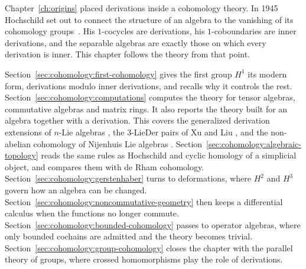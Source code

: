 Chapter~\ref{ch:origins} placed derivations inside a cohomology theory. In 1945 Hochschild
set out to connect the structure of an algebra to the vanishing of its cohomology
groups~\cite[p.~58]{Hochschild1945}. His $1$-cocycles are derivations, his
$1$-coboundaries are inner derivations, and the separable algebras are exactly those
on which every derivation is inner. This chapter follows the theory from that point.

Section~\ref{sec:cohomology:first-cohomology} gives the first group $H^1$ its modern
form, derivations modulo inner derivations, and recalls why it controls the rest.
Section~\ref{sec:cohomology:computations} computes the theory for tensor algebras,
commutative algebras and matrix rings. It also reports the theory built for an
algebra together with a derivation. This covers the generalized derivation
extensions of $n$-Lie algebras
\cite[Proposition~2.13, pp.~25--26]{AtesliEsenSutlu2021}, the
$3$-LieDer pairs of Xu and Liu \cite[p.~1]{XuLiu2021ThreeLieDer}, and the
non-abelian cohomology of Nijenhuis Lie algebras
\cite[Theorem~3.4, p.~6]{Das2025Nijenhuis}. Section~\ref{sec:cohomology:algebraic-topology} reads the same
rules as Hochschild and cyclic homology of a simplicial object, and compares
them with de Rham cohomology.
Section~\ref{sec:cohomology:gerstenhaber} turns to
deformations, where $H^2$ and $H^3$ govern how an algebra can be changed.
Section~\ref{sec:cohomology:noncommutative-geometry} then keeps a differential
calculus when the functions no longer commute.
Section~\ref{sec:cohomology:bounded-cohomology} passes to operator algebras, where only
bounded cochains are admitted and the theory becomes trivial.
Section~\ref{sec:cohomology:group-cohomology} closes the chapter with the parallel theory
of groups, where crossed homomorphisms play the role of derivations.
